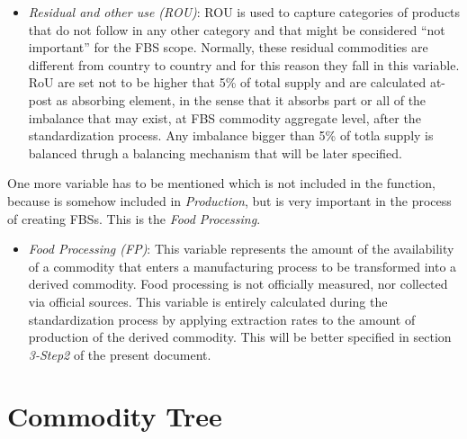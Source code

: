 \documentclass[]{article}
\providecommand{\tightlist}{%
  \setlength{\itemsep}{0pt}\setlength{\parskip}{0pt}}
\begin{document}
\begin{itemize}
{    a proper documentation}.
\item
  \emph{Residual and other use (ROU)}: ROU is used to capture categories
  of products that do not follow in any other category and that might be
  considered ``not important'' for the FBS scope. Normally, these
  residual commodities are different from country to country and for
  this reason they fall in this variable. RoU are set not to be higher
  that 5\% of total supply and are calculated at-post as absorbing
  element, in the sense that it absorbs part or all of the imbalance
  that may exist, at FBS commodity aggregate level, after the
  standardization process. Any imbalance bigger than 5\% of totla supply
  is balanced thrugh a balancing mechanism that will be later specified.
\end{itemize}

One more variable has to be mentioned which is not included in the
function, because is somehow included in \emph{Production}, but is very
important in the process of creating FBSs. This is the \emph{Food
Processing}.

\begin{itemize}
\tightlist
\item
  \emph{Food Processing (FP)}: This variable represents the amount of
  the availability of a commodity that enters a manufacturing process to
  be transformed into a derived commodity. Food processing is not
  officially measured, nor collected via official sources. This variable
  is entirely calculated during the standardization process by applying
  extraction rates to the amount of production of the derived commodity.
  This will be better specified in section \emph{3-Step2} of the present
  document.
\end{itemize}

\section*{Commodity Tree}\label{commodity-tree}
\end{document}
